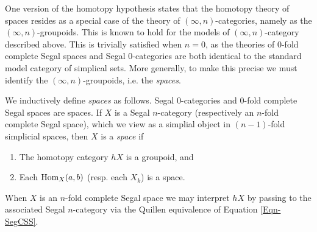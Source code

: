 \documentclass{amsart}
\begin{document}


One version of the homotopy hypothesis states that the homotopy theory of spaces resides as a special case of the theory of $(\infty,n)$-categories, namely as the $(\infty,n)$-groupoids. This is known to hold for the models of $(\infty,n)$-category described above. This is trivially satisfied when $n=0$, as the theories of $0$-fold complete Segal spaces and Segal $0$-categories are both identical to the standard model category of simplical sets. More generally, to make this precise we must identify the $(\infty,n)$-groupoids, i.e. the {\em spaces}.

\begin{definition}
	We inductively define {\em spaces} as follows. Segal $0$-categories and $0$-fold complete Segal spaces are spaces. If $X$ is a Segal $n$-category (respectively an $n$-fold complete Segal space), which we view as a simplial object in $(n-1)$-fold simplicial spaces, then $X$ is a {\em space} if
	\begin{enumerate}
		\item The homotopy category $\mathit{h}X$ is a groupoid, and
		\item Each $\operatorname{Hom}_X(a,b)$ (resp. each $X_k$) is a space. 
	\end{enumerate}
	When $X$ is an  $n$-fold complete Segal space we may interpret $\mathit{h}X$ by passing to the associated Segal $n$-category via the Quillen equivalence of Equation \ref{Eqn-SegCSS}.
\end{definition}
\end{document}
